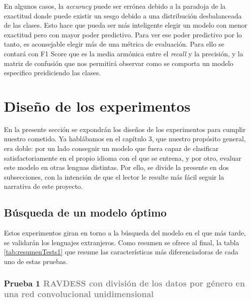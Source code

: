 \documentclass[11pt,a4paper,spanish]{book}
\begin{document}
	En algunos casos, la \emph{accuracy} puede ser errónea debido a la paradoja de la exactitud donde puede existir un sesgo debido a una distribución desbalanceada de las clases. Esto hace que pueda ser más inteligente elegir un modelo con menor exactitud pero con mayor poder predictivo.
	Para ver ese poder predictivo por lo tanto, es aconsejable elegir más de una métrica de evaluación. Para ello se contará con F1 Score que es la media armónica entre el \emph{recall} y la precisión, y la matriz de confusión que nos permitirá observar como se comporta un modelo especifico preidiciendo las clases.
	
	
	\section{Diseño de los experimentos}
	En la presente sección se expondrán los diseños de los experimentos para cumplir nuestro cometido. Ya hablábamos en el capítulo 3, que nuestro propósito general, era doble: por un lado conseguir un modelo que fuera capaz de clasificar satisfactoriamente en el propio idioma con el que se entrena, y por otro, evaluar este modelo en otras lenguas distintas. Por ello, se divide la presente en dos subsecciones, con la intención de que el lector le resulte más fácil seguir la narrativa de este proyecto.
	
	\subsection{Búsqueda de un  modelo óptimo}
	Estos experimentos giran en torno a la búsqueda del modelo en el que más tarde, se validarán los lenguajes extranjeros. Como resumen se ofrece al final, la tabla \ref{tab:resumenTests1} que resume las características más diferenciadoras de cada uno de estas pruebas.
	
	\subsubsection[]{\large Prueba 1 {\normalsize \textcolor{Gray}{RAVDESS con división de los datos por género en una red convolucional unidimensional}}}
	
\end{document}

